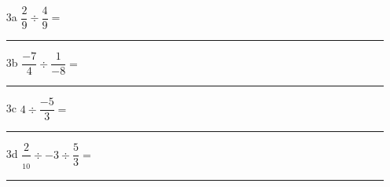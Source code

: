 \documentclass[12pt]{article}
\begin{document}
\begin{enumerate}
\item[3a] $ \dfrac{2}{9} \div \dfrac{4}{9} = $\\
  \rule{\linewidth}{0.5pt}
\item[3b] $ \dfrac{-7}{4} \div \dfrac{1}{-8} = $\\
  \rule{\linewidth}{0.5pt}
\item[3c] $ 4 \div \dfrac{-5}{3} = $\\
    \rule{\linewidth}{0.5pt}
\item[3d] $ \dfrac{2}{_10} \div -3 \div \dfrac{5}{3} = $\\
  \rule{\linewidth}{0.5pt}
\end{enumerate}
\end{document}

